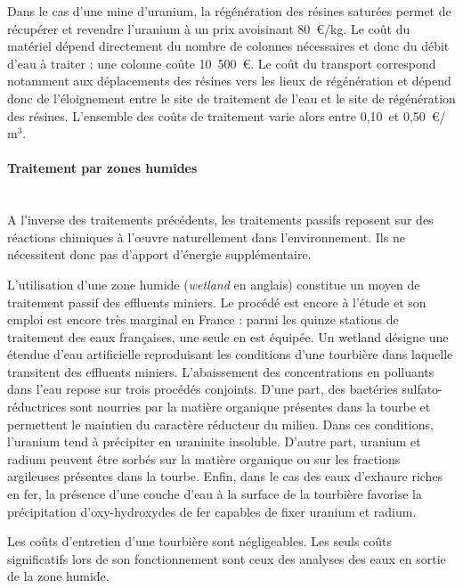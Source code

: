 \documentclass{article}
\begin{document}

Dans le cas d’une mine d’uranium, la régénération des résines saturées permet de récupérer et revendre l’uranium à un prix avoisinant 80~\euro{}/kg. Le coût du matériel dépend directement du nombre de colonnes nécessaires et donc du débit d’eau à traiter : une colonne coûte 10~500~\euro{}. Le coût du transport correspond notamment aux déplacements des résines vers les lieux de régénération et dépend donc de l’éloignement entre le site de traitement de l’eau et le site de régénération des résines. L’ensemble des coûts de traitement varie alors entre 0,10~et 0,50~\euro{}/$\text{m}^3$.

\paragraph{Traitement par zones humides \\ \\}

A l’inverse des traitements précédents, les traitements passifs reposent sur des réactions chimiques à l’œuvre naturellement dans l’environnement. Ils ne nécessitent donc pas d’apport d’énergie supplémentaire. 

L’utilisation d’une zone humide (\textit{wetland} en anglais) constitue un moyen de traitement passif des effluents miniers. Le procédé est encore à l’étude et son emploi est encore très marginal en France : parmi les quinze stations de traitement des eaux françaises, une seule en est équipée. Un wetland désigne une étendue d’eau artificielle reproduisant les conditions d’une tourbière dans laquelle transitent des effluents miniers. L’abaissement des concentrations en polluants dans l’eau repose sur trois procédés conjoints. D’une part, des bactéries sulfato-réductrices sont nourries par la matière organique présentes dans la tourbe et permettent le maintien du caractère réducteur du milieu. Dans ces conditions, l’uranium tend à précipiter en uraninite insoluble. D’autre part, uranium et radium peuvent être sorbés sur la matière organique ou sur les fractions argileuses présentes dans la tourbe. Enfin, dans le cas des eaux d’exhaure riches en fer, la présence d’une couche d’eau à la surface de la tourbière favorise la précipitation d’oxy-hydroxydes de fer capables de fixer uranium et radium. 

Les coûts d’entretien d’une tourbière sont négligeables. Les seuls coûts significatifs lors de son fonctionnement sont ceux des analyses des eaux en sortie de la zone humide.
\end{document}
